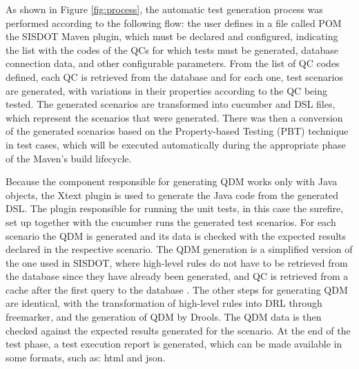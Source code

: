 \documentclass[twocolumn]{bmcart}%
\begin{document}
As shown in Figure \ref{fig:process}, the automatic test generation process was performed according to the following flow: the user defines in a file called POM the SISDOT Maven plugin, which must be declared and configured, indicating the list with the codes of the QCs for which tests must be generated, database connection data, and other configurable parameters. From the list of QC codes defined, each QC is retrieved from the database and for each one, test scenarios are generated, with variations in their properties according to the QC being tested. The generated scenarios are transformed into cucumber and DSL files, which represent the scenarios that were generated. There was then a conversion of the generated scenarios based on the Property-based Testing (PBT) technique in test cases, which will be executed automatically during the appropriate phase of the Maven's build lifecycle.


Because the component responsible for generating QDM works only with Java objects, the Xtext plugin is used to generate the Java code from the generated DSL. The plugin responsible for running the unit tests, in this case the surefire, set up together with the cucumber runs the generated test scenarios. For each scenario the QDM is generated and its data is checked with the expected results declared in the respective scenario. The QDM generation is a simplified version of the one used in SISDOT, where high-level rules do not have to be retrieved from the database since they have already been generated, and QC is retrieved from a cache after the first query to the database . The other steps for generating QDM are identical, with the transformation of high-level rules into DRL through freemarker, and the generation of QDM by Drools. The QDM data is then checked against the expected results generated for the scenario. At the end of the test phase, a test execution report is generated, which can be made available in some formats, such as: html and json.
\end{document}
